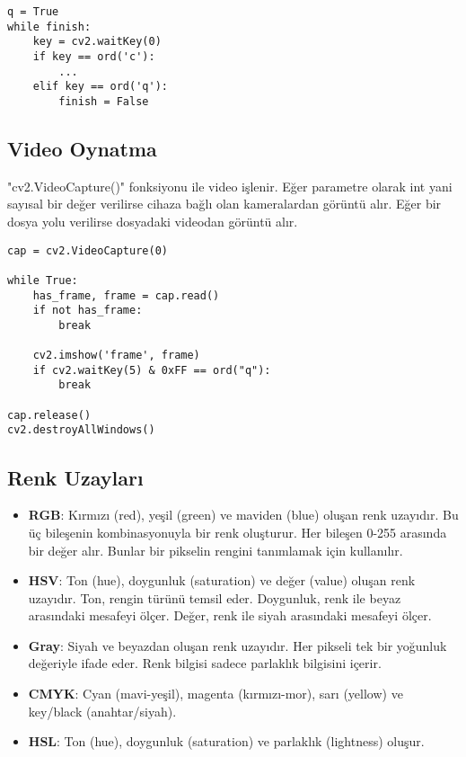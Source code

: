 \begin{lstlisting}
q = True
while finish:
	key = cv2.waitKey(0)
	if key == ord('c'):
		...
	elif key == ord('q'): 
		finish = False
\end{lstlisting}

\subsection{Video Oynatma}
"cv2.VideoCapture()" fonksiyonu ile video işlenir. Eğer parametre olarak int yani sayısal bir değer verilirse cihaza bağlı olan kameralardan görüntü alır. Eğer bir dosya yolu verilirse dosyadaki videodan görüntü alır.

\begin{lstlisting}
cap = cv2.VideoCapture(0)

while True:
	has_frame, frame = cap.read()
	if not has_frame:
		break

	cv2.imshow('frame', frame)
	if cv2.waitKey(5) & 0xFF == ord("q"):
		break

cap.release()
cv2.destroyAllWindows()
\end{lstlisting}

\subsection{Renk Uzayları}
\begin{itemize}
	\item \textbf{RGB}: Kırmızı (red), yeşil (green) ve maviden (blue) oluşan renk uzayıdır. Bu üç bileşenin kombinasyonuyla bir renk oluşturur. Her bileşen 0-255 arasında bir değer alır. Bunlar bir pikselin rengini tanımlamak için kullanılır.
	\item \textbf{HSV}: Ton (hue), doygunluk (saturation) ve değer (value) oluşan renk uzayıdır. Ton, rengin türünü temsil eder. Doygunluk, renk ile beyaz arasındaki mesafeyi ölçer. Değer, renk ile siyah arasındaki mesafeyi ölçer. 
	\item \textbf{Gray}: Siyah ve beyazdan oluşan renk uzayıdır. Her pikseli tek bir yoğunluk değeriyle ifade eder. Renk bilgisi sadece parlaklık bilgisini içerir. 
	\item \textbf{CMYK}: Cyan (mavi-yeşil), magenta (kırmızı-mor), sarı (yellow) ve key/black (anahtar/siyah).
	\item \textbf{HSL}: Ton (hue), doygunluk (saturation) ve parlaklık (lightness) oluşur. 
\end{itemize}

\newpage
